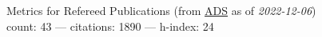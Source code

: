 Metrics for Refereed Publications (from \href{\adsurl}{ADS} as of \textit{2022-12-06}) \\count: 43 --- citations: 1890 --- h-index: 24
